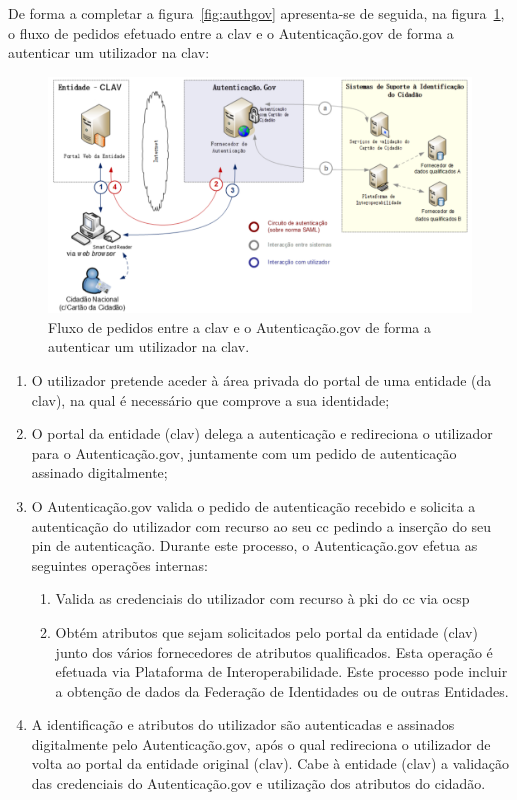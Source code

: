 De forma a completar a figura~\ref{fig:authgov} apresenta-se de seguida, na figura~\ref{fig:fluxoauthgov}, o fluxo de pedidos efetuado entre a \acrshort{clav} e o Autenticação.gov de forma a autenticar um utilizador na \acrshort{clav}:~\cite{agov}
\begin{figure}[H]
    \centering
    \includegraphics[width=1\textwidth]{img/fluxoauthgov.png}
    \caption{Fluxo de pedidos entre a \acrshort{clav} e o Autenticação.gov de forma a autenticar um utilizador na \acrshort{clav}.~\cite{agov}}\label{fig:fluxoauthgov}
\end{figure}

\begin{enumerate}
    \item O utilizador pretende aceder à área privada do portal de uma entidade (da \acrshort{clav}), na qual é necessário que comprove a sua identidade;
    \item O portal da entidade (\acrshort{clav}) delega a autenticação e redireciona o utilizador para o Autenticação.gov, juntamente com um pedido de autenticação assinado digitalmente;
    \item O Autenticação.gov valida o pedido de autenticação recebido e solicita a autenticação do utilizador com recurso ao seu \acrshort{cc} pedindo a inserção do seu \acrshort{pin} de autenticação. Durante este processo, o Autenticação.gov efetua as seguintes operações internas:
    \begin{enumerate}
        \item Valida as credenciais do utilizador com recurso à \acrshort{pki} do \acrshort{cc} via \acrshort{ocsp}
        \item Obtém atributos que sejam solicitados pelo portal da entidade (\acrshort{clav}) junto dos vários fornecedores de atributos qualificados. Esta operação é efetuada via Plataforma de Interoperabilidade. Este processo pode incluir a obtenção de dados da Federação de Identidades ou de outras Entidades.
    \end{enumerate}
    \item A identificação e atributos do utilizador são autenticadas e assinados digitalmente pelo Autenticação.gov, após o qual redireciona o utilizador de volta ao portal da entidade original (\acrshort{clav}). Cabe à entidade (\acrshort{clav}) a validação das credenciais do Autenticação.gov e utilização dos atributos do cidadão.
\end{enumerate}

